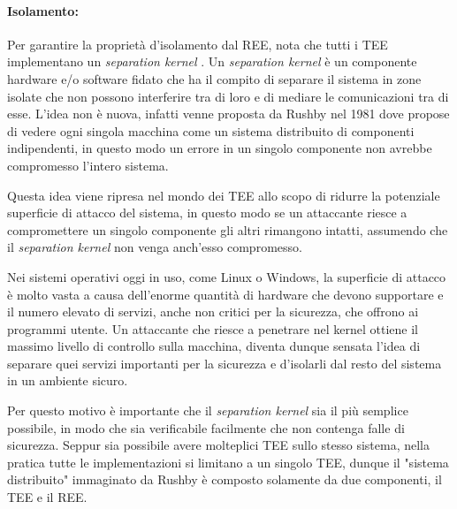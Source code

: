 \documentclass[12pt,italian]{report}
\begin{document}

\paragraph{Isolamento:}
Per garantire la proprietà d'isolamento dal REE, \cite{sabt2015tee} nota
che tutti i TEE implementano un \textit{separation kernel}
\cite{rushby1981separationkernel}. 
Un \textit{separation kernel} è un componente hardware e/o software fidato che
ha il compito di separare il sistema in zone isolate che non possono
interferire tra di loro e di mediare le comunicazioni tra di esse.
L'idea non è nuova, infatti venne proposta da Rushby nel 1981 dove propose
di vedere ogni singola macchina come un sistema distribuito di componenti
indipendenti, in questo modo un errore in un singolo componente non avrebbe
compromesso l'intero sistema.

Questa idea viene ripresa nel mondo dei TEE allo scopo di ridurre la
potenziale superficie di attacco del sistema, in questo modo se un
attaccante riesce a compromettere un singolo componente gli altri rimangono
intatti, assumendo che il \textit{separation kernel} non venga anch'esso
compromesso.

Nei sistemi operativi oggi in uso, come Linux o Windows, la superficie di
attacco è molto vasta a causa dell'enorme quantità di hardware che devono
supportare e il numero elevato di servizi, anche non critici per la sicurezza,
che offrono ai programmi utente. 
Un attaccante che riesce a penetrare nel kernel ottiene il massimo livello di
controllo sulla macchina, diventa dunque sensata l'idea di separare quei
servizi importanti per la sicurezza e d'isolarli dal resto del sistema in
un ambiente sicuro.

Per questo motivo è importante che il \textit{separation kernel} sia
il più semplice possibile, in modo che sia verificabile facilmente che non
contenga falle di sicurezza.
Seppur sia possibile avere molteplici TEE sullo stesso sistema, nella pratica
tutte le implementazioni si limitano a un singolo TEE, dunque il
"sistema distribuito" immaginato da Rushby è composto solamente da due
componenti, il TEE e il REE.
\end{document}
